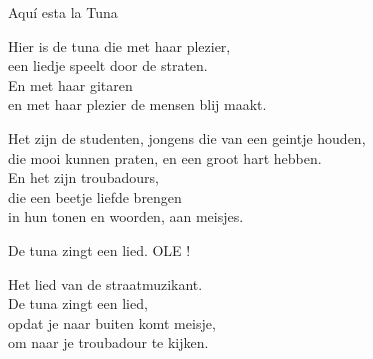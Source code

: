 \begin{song}{Aquí esta la Tuna}
\end{song}
\clearpage
\begin{translation}
Hier is de tuna die met haar plezier,\\
een liedje speelt door de straten.\\
En met haar gitaren\\
en met haar plezier de mensen blij maakt.\vspace{\wlskip}

Het zijn de studenten, jongens die van een geintje houden,\\
die mooi kunnen praten, en een groot hart hebben.\\
En het zijn troubadours,\\
die een beetje liefde brengen\\
in hun tonen en woorden, aan meisjes.\vspace{\wlskip}

De tuna zingt een lied. OLE !\vspace{\wlskip}

Het lied van de straatmuzikant.\\
De tuna zingt een lied,\\
opdat je naar buiten komt meisje,\\
om naar je troubadour te kijken.
\end{translation}
